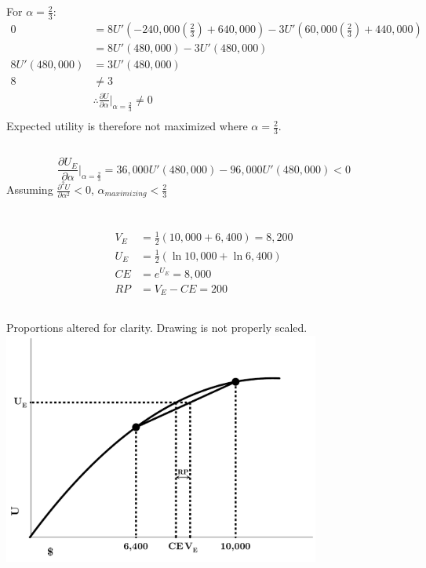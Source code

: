 \documentclass{article}
\begin{document}
	\subsection[c]{}
		For  $ \alpha = \frac{2}{3} $:
		\setcounter{equation}{0}
		\begin{align}
			0 &= 8U' \left ( -240,000 \left ( \frac{2}{3} \right ) + 640,000 \right )
			-3U' \left (60,000 \left ( \frac{2}{3} \right ) + 440,000 \right ) \\
			&= 8U'(480,000)-3U'(480,000) \\
			8U'(480,000) &= 3U'(480,000) \\
			8 & \not= 3 \\
			& \therefore \frac{\partial U}{\partial \alpha} \bigg  |_{\alpha = \frac{2}{3}} \not = 0 \\
		\end{align}
		Expected utility is therefore not maximized where $ \alpha = \frac{2}{3} $.
	\subsection[d]{}
		$$
			\frac{\partial U_E}{\partial \alpha} \bigg |_{\alpha = \frac{2}{3}} = 36,000U'(480,000)-96,000U'(480,000)<0
		$$
		Assuming $ \frac{\partial^2 U}{\partial \alpha^2}<0$, $\alpha_{maximizing}<\frac{2}{3} $
		
\section[3]{}
	\subsection[a]{}
		\begin{align*}
			V_E &= \frac{1}{2}(10,000+6,400) = 8,200 \\
			U_E &=\frac{1}{2}(\ln 10,000 + \ln 6,400) \\
			CE &= e^{U_E} = 8,000 \\
			RP &= V_E - CE =200
		\end{align*}
	\subsection[b]{}
		Proportions altered for clarity. Drawing is not properly scaled.  \\
		\includegraphics[height=3in]{Charts/3b}
\end{document}
